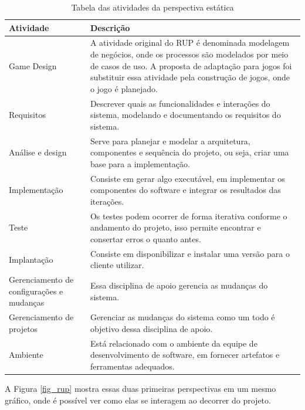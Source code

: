 \documentclass[quali]{ppgccufscar}
\begin{document}
\begin{table}[h]
\centering
\caption{Tabela das atividades da perspectiva estática}
\label{tabela_rup}
\begin{tabular}{|p{30mm}|p{120mm}|}
\hline
\textbf{Atividade}                        & \textbf{Descrição} \\ \hline 
Game Design                               & A atividade original do RUP é denominada modelagem de negócios, onde os processos são modelados por meio de casos de uso. A proposta de adaptação para jogos foi substituir essa atividade pela construção de jogos, onde o jogo é planejado. \\ \hline 
Requisitos                                & Descrever quais as funcionalidades e interações do sistema, modelando e documentando os requisitos do sistema. \\ \hline 
Análise e design                          & Serve para planejar e modelar a arquitetura, componentes e sequência do projeto, ou seja, criar uma base para a implementação. \\ \hline 
Implementação                             & Consiste em gerar algo executável, em implementar os componentes do software e integrar os resultados das iterações. \\ \hline 
Teste                                     & Os testes podem ocorrer de forma iterativa conforme o andamento do projeto, isso permite encontrar e consertar erros o quanto antes. \\ \hline 
Implantação                               & Consiste em disponibilizar e instalar uma versão para o cliente utilizar. \\ \hline 
Gerenciamento de configurações e mudanças & Essa disciplina de apoio gerencia as mudanças do sistema. \\ \hline 
Gerenciamento de projetos                 & Gerenciar as mudanças do sistema como um todo é objetivo dessa disciplina de apoio. \\ \hline 
Ambiente                                  & Está relacionado com o ambiente da equipe de desenvolvimento de software, em fornecer artefatos e ferramentas adequados. \\ \hline
\end{tabular}
\end{table}

A Figura \ref{fig_rup} mostra essas duas primeiras perspectivas em um mesmo gráfico, onde é possível ver como elas se interagem ao decorrer do projeto.
\end{document}
